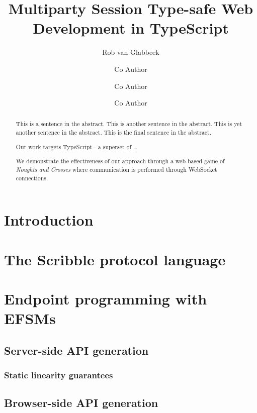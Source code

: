 \documentclass[submission,copyright,creativecommons]{eptcs}
\title{Multiparty Session Type-safe Web Development in TypeScript}
\author{Rob van Glabbeek
\institute{NICTA\\ Sydney, Australia}
\email{rvg@cs.stanford.edu}
\and
Co Author
\institute{Stanford Univeristy\\
California, USA}
\email{is@gmail.com}
\and
Co Author
\institute{Stanford Univeristy\\
California, USA}
\email{is@gmail.com}
\and
Co Author
\institute{Stanford Univeristy\\
California, USA}
\email{is@gmail.com}
}
\begin{document}
\maketitle

\begin{abstract}
This is a sentence in the abstract.
This is another sentence in the abstract.
This is yet another sentence in the abstract.
This is the final sentence in the abstract.



Our work targets TypeScript - a superset of \dots

We demonstrate the effectiveness of our approach through a web-based game of \textit{Noughts and Crosses} where communication is performed through WebSocket connections.

\end{abstract}

\section{Introduction}

\section{The Scribble protocol language}

\section{Endpoint programming with EFSMs}

\subsection{Server-side API generation}

\subsubsection{Static linearity guarantees}

\subsection{Browser-side API generation}
\end{document}
